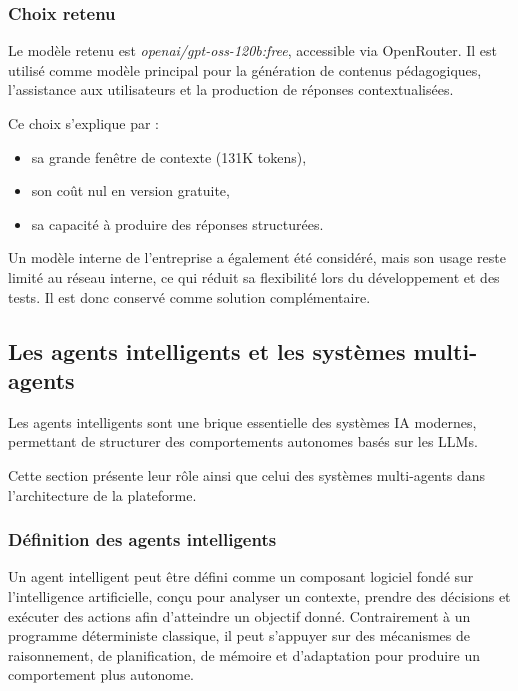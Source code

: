 \subsubsection{Choix retenu}

Le modèle retenu est \textit{openai/gpt-oss-120b:free}, accessible via OpenRouter. Il est utilisé comme modèle principal pour la génération de contenus pédagogiques, l'assistance aux utilisateurs et la production de réponses contextualisées.

Ce choix s'explique par :

\begin{itemize}
    \item sa grande fenêtre de contexte (131K tokens),
    \item son coût nul en version gratuite,
    \item sa capacité à produire des réponses structurées.
\end{itemize}

Un modèle interne de l'entreprise a également été considéré, mais son usage reste limité au réseau interne, ce qui réduit sa flexibilité lors du développement et des tests. Il est donc conservé comme solution complémentaire.

\subsection{Les agents intelligents et les systèmes multi-agents}

Les agents intelligents sont une brique essentielle des systèmes IA modernes, permettant de structurer des comportements autonomes basés sur les LLMs.

Cette section présente leur rôle ainsi que celui des systèmes multi-agents dans l'architecture de la plateforme.

\subsubsection{Définition des agents intelligents}

Un agent intelligent \cite{google_ai_agents} peut être défini comme un composant logiciel
fondé sur l'intelligence artificielle, conçu pour analyser un contexte, prendre des décisions
et exécuter des actions afin d'atteindre un objectif donné. Contrairement à un programme
déterministe classique, il peut s'appuyer sur des mécanismes de raisonnement, de planification,
de mémoire et d'adaptation pour produire un comportement plus autonome.

